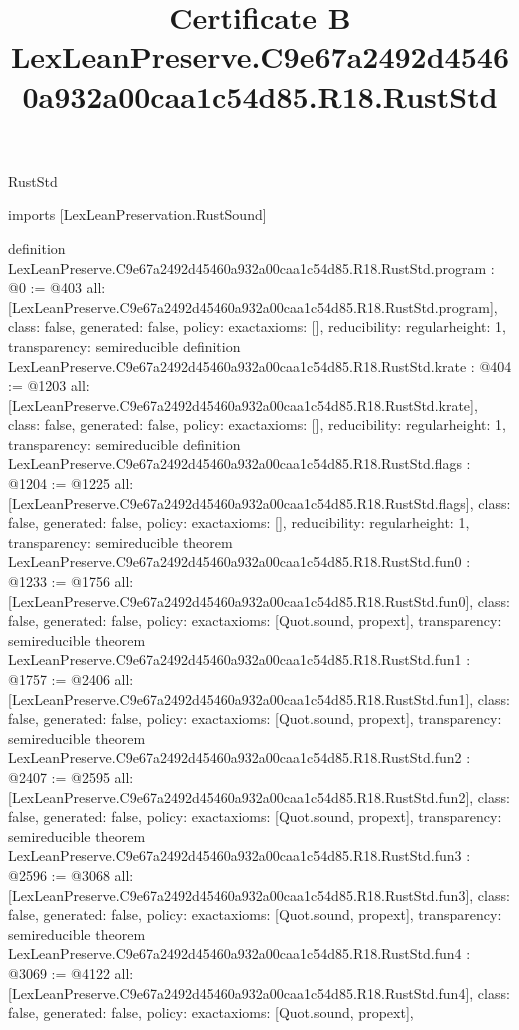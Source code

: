 \begin{lexlean}{RustStd}
\title{Certificate B LexLeanPreserve.C9e67a2492d45460a932a00caa1c54d85.R18.RustStd}
\begin{coremodule}
imports [LexLeanPreservation.RustSound]

definition LexLeanPreserve.C9e67a2492d45460a932a00caa1c54d85.R18.RustStd.program : @0 := @403 {
  all: [LexLeanPreserve.C9e67a2492d45460a932a00caa1c54d85.R18.RustStd.program],
  class: false,
  generated: false,
  policy: exact{axioms: []},
  reducibility: regular{height: 1},
  transparency: semireducible
}
definition LexLeanPreserve.C9e67a2492d45460a932a00caa1c54d85.R18.RustStd.krate : @404 := @1203 {
  all: [LexLeanPreserve.C9e67a2492d45460a932a00caa1c54d85.R18.RustStd.krate],
  class: false,
  generated: false,
  policy: exact{axioms: []},
  reducibility: regular{height: 1},
  transparency: semireducible
}
definition LexLeanPreserve.C9e67a2492d45460a932a00caa1c54d85.R18.RustStd.flags : @1204 := @1225 {
  all: [LexLeanPreserve.C9e67a2492d45460a932a00caa1c54d85.R18.RustStd.flags],
  class: false,
  generated: false,
  policy: exact{axioms: []},
  reducibility: regular{height: 1},
  transparency: semireducible
}
theorem LexLeanPreserve.C9e67a2492d45460a932a00caa1c54d85.R18.RustStd.fun0 : @1233 := @1756 {
  all: [LexLeanPreserve.C9e67a2492d45460a932a00caa1c54d85.R18.RustStd.fun0],
  class: false,
  generated: false,
  policy: exact{axioms: [Quot.sound, propext]},
  transparency: semireducible
}
theorem LexLeanPreserve.C9e67a2492d45460a932a00caa1c54d85.R18.RustStd.fun1 : @1757 := @2406 {
  all: [LexLeanPreserve.C9e67a2492d45460a932a00caa1c54d85.R18.RustStd.fun1],
  class: false,
  generated: false,
  policy: exact{axioms: [Quot.sound, propext]},
  transparency: semireducible
}
theorem LexLeanPreserve.C9e67a2492d45460a932a00caa1c54d85.R18.RustStd.fun2 : @2407 := @2595 {
  all: [LexLeanPreserve.C9e67a2492d45460a932a00caa1c54d85.R18.RustStd.fun2],
  class: false,
  generated: false,
  policy: exact{axioms: [Quot.sound, propext]},
  transparency: semireducible
}
theorem LexLeanPreserve.C9e67a2492d45460a932a00caa1c54d85.R18.RustStd.fun3 : @2596 := @3068 {
  all: [LexLeanPreserve.C9e67a2492d45460a932a00caa1c54d85.R18.RustStd.fun3],
  class: false,
  generated: false,
  policy: exact{axioms: [Quot.sound, propext]},
  transparency: semireducible
}
theorem LexLeanPreserve.C9e67a2492d45460a932a00caa1c54d85.R18.RustStd.fun4 : @3069 := @4122 {
  all: [LexLeanPreserve.C9e67a2492d45460a932a00caa1c54d85.R18.RustStd.fun4],
  class: false,
  generated: false,
  policy: exact{axioms: [Quot.sound, propext]},
}
\end{coremodule}
\end{lexlean}
